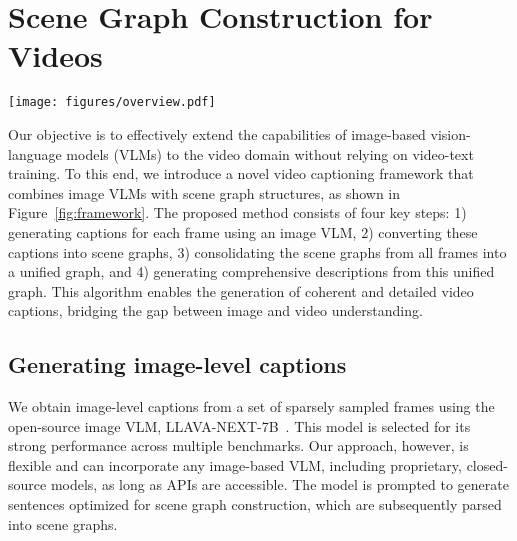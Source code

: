 
\section{Scene Graph Construction for Videos}
\label{sec:scene}
\begin{figure*}[t]
    \centering
    \texttt{[image: figures/overview.pdf]}
    \vspace{-4mm}
    \caption{An overview of our zero-shot video caption generation pipeline. The pipeline consists of (a) frame-level caption generation using image VLMs, (b) textual scene graph parsing for each frame caption, (c) merging of scene graphs into a unified graph, and (d) video-level caption generation through our graph-to-text model. Our proposed framework leverages frame-level scene graphs to produce detailed and coherent video captions.
    }
    \label{fig:framework}
\end{figure*}

Our objective is to effectively extend the capabilities of image-based vision-language models (VLMs) to the video domain without relying on video-text training. 
To this end, we introduce a novel video captioning framework that combines image VLMs with scene graph structures, as shown in Figure~\ref{fig:framework}.
The proposed method consists of four key steps: 1) generating captions for each frame using an image VLM, 2) converting these captions into scene graphs, 3) consolidating the scene graphs from all frames into a unified graph, and 4) generating comprehensive descriptions from this unified graph. 
This algorithm enables the generation of coherent and detailed video captions, bridging the gap between image and video understanding.

\subsection{Generating image-level captions}
\label{sub:generating}
We obtain image-level captions from a set of sparsely sampled frames using the open-source image VLM, LLAVA-NEXT-7B~\cite{liu2024llavanext}.
This model is selected for its strong performance across multiple benchmarks.
Our approach, however, is flexible and can incorporate any image-based VLM, including proprietary, closed-source models, as long as APIs are accessible.
The model is prompted to generate sentences optimized for scene graph construction, which are subsequently parsed into scene graphs.

